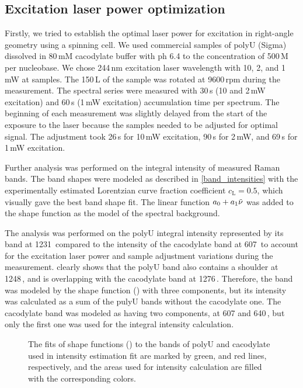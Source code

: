 \subsection{Excitation laser power optimization}
\label{subsec:power_optim}

Firstly, we tried to establish the optimal laser power for excitation in
right-angle geometry using a spinning cell.
We used commercial samples of polyU (Sigma) dissolved in 80\,mM cacodylate
buffer with ph 6.4 to the concentration of 500\,M per nucleobase.
We chose 244\,nm excitation laser wavelength with 10, 2, and 1 mW at samples.
The 150\,L of the sample was rotated at 9600\,rpm during the measurement.
The spectral series were measured with 30\,s (10 and 2\,mW excitation) and
60\,s (1\,mW excitation) accumulation time per spectrum.
The beginning of each measurement was slightly delayed from the start of
the exposure to the laser because the samples needed to be adjusted for
optimal signal.
The adjustment took 26\,s for 10\,mW excitation, 90\,s for 2\,mW, and 69\,s
for 1\,mW excitation.

Further analysis was performed on the integral intensity of measured Raman
bands.
The band shapes were modeled as described in
\cref{band_intensities}
with the experimentally estimated Lorentzian curve fraction coefficient
$c_\text{L} = 0.5$, which visually gave the best band shape fit.
The linear function $a_0 + a_1\tilde{\nu}$ was added to the shape function
as the model of the spectral background.

The analysis was performed on the polyU integral intensity represented by
its band at 1231\,\icm{} compared to the intensity of the cacodylate band at
607\,\icm{} to account for the excitation laser power and sample adjustment
variations during the measurement.
clearly shows that the polyU band also contains a shoulder at 1248\,\icm{}, and
is overlapping with the cacodylate band at 1276\,\icm.
Therefore, the band was modeled by the shape function
()
with three components, but its intensity was calculated as a sum of the pulyU
bands without the cacodylate one.
The cacodylate band was modeled as having two components, at 607 and 640\,\icm,
but only the first one was used for the integral intensity calculation.

\begin{figure}
	\centering
	
	\caption[%
		Example UV RR spectrum of polyU dissolved in cacodylate buffer.%
	]{%
		The fits of shape functions
		()
		to the bands of polyU and cacodylate used in intensity estimation fit are
		marked by green, and red lines, respectively, and the areas used for
		intensity calculation are filled with the corresponding colors.
	}
	\label{\figlabel{power_optim:triplexes_pU}}
\end{figure}


